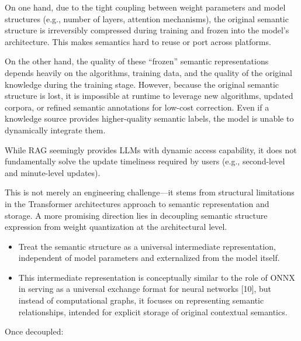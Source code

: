 \documentclass[conference]{IEEEtran}
\begin{document}
On one hand, due to the tight coupling between weight parameters and
model structures (e.g., number of layers, attention mechanisms), the
original semantic structure is irreversibly compressed during training
and frozen into the model's architecture. This makes semantics hard to
reuse or port across platforms.

On the other hand, the quality of these ``frozen'' semantic
representations depends heavily on the algorithms, training data, and
the quality of the original knowledge during the training stage.
However, because the original semantic structure is lost, it is
impossible at runtime to leverage new algorithms, updated corpora, or
refined semantic annotations for low-cost correction. Even if a
knowledge source provides higher-quality semantic labels, the model is
unable to dynamically integrate them.

While RAG seemingly provides LLMs with dynamic access capability, it
does not fundamentally solve the update timeliness required by users
(e.g., second-level and minute-level updates).

This is not merely an engineering challenge---it stems from structural
limitations in the Transformer architecture\textquotesingle s approach
to semantic representation and storage. A more promising direction lies
in decoupling semantic structure expression from weight quantization at
the architectural level.

\begin{itemize}
\item
  Treat the semantic structure as a universal intermediate
  representation, independent of model parameters and externalized from
  the model itself.
\item
  This intermediate representation is conceptually similar to the role
  of ONNX in serving as a universal exchange format for neural networks
  {[}10{]}, but instead of computational graphs, it focuses on
  representing semantic relationships, intended for explicit storage of
  original contextual semantics.
\end{itemize}

Once decoupled:
\end{document}
